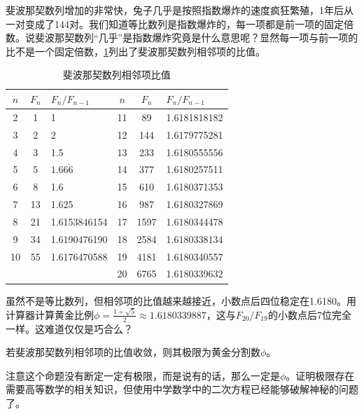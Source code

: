 \documentclass[b5paper]{ctexart}
\begin{document}
斐波那契数列增加的非常快，兔子几乎是按照指数爆炸的速度疯狂繁殖，1年后从一对变成了144对。我们知道等比数列是指数爆炸的，每一项都是前一项的固定倍数。说斐波那契数列“几乎”是指数爆炸究竟是什么意思呢？显然每一项与前一项的比不是一个固定倍数，\cref{tab:fibonacci-ratios}列出了斐波那契数列相邻项的比值。

\begin{table}[ht]
    \centering
    \begin{tabular}{|c|c|l||c|c|l|}
        \hline
        $n$ & $F_n$ & $F_n/F_{n-1}$ & $n$ & $F_n$ & $F_n/F_{n-1}$\\
        \hline
        2 & 1 & 1 &         11 & 89   & 1.6181818182 \\
        3 & 2 & 2 &        12 & 144  & 1.6179775281 \\
        4 & 3 & 1.5 &        13 & 233  & 1.6180555556 \\
        5 & 5     & $1.66\dot{6}$ &        14 & 377  & 1.6180257511 \\
        6 & 8     & 1.6 &         15 & 610  & 1.6180371353 \\
        7 & 13    & 1.625 &         16 & 987  & 1.6180327869 \\
        8 & 21    & 1.6153846154 &        17 & 1597 & 1.6180344478 \\
        9 & 34    & 1.6190476190 &        18 & 2584 & 1.6180338134 \\
        10 & 55   & 1.6176470588 &        19 & 4181 & 1.6180340557 \\
           &      &              &        20 & 6765 & 1.6180339632 \\
        \hline
    \end{tabular}
    \caption{斐波那契数列相邻项比值}
    \label{tab:fibonacci-ratios}
\end{table}

虽然不是等比数列，但相邻项的比值越来越接近，小数点后四位稳定在1.6180。用计算器计算黄金比例$\phi = \frac{1+\sqrt{5}}{2} \approx 1.6180339887$，这与$F_{20}/F_{19}$的小数点后7位完全一样。这难道仅仅是巧合么？

\begin{proposition}
若斐波那契数列相邻项的比值收敛，则其极限为黄金分割数$\phi$。
\end{proposition}

注意这个命题没有断定一定有极限，而是说有的话，那么一定是$\phi$。证明极限存在需要高等数学的相关知识，但使用中学数学中的二次方程已经能够破解神秘的问题了。
\end{document}
